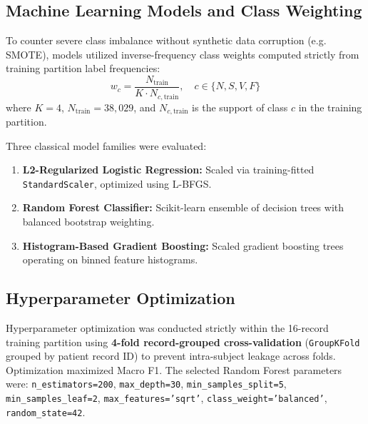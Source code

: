 \documentclass[conference]{IEEEtran}
\begin{document}
\subsection{Machine Learning Models and Class Weighting}
To counter severe class imbalance without synthetic data corruption (e.g. SMOTE), models utilized inverse-frequency class weights computed strictly from training partition label frequencies:
\begin{equation}
    w_c = \frac{N_{\text{train}}}{K \cdot N_{c, \text{train}}}, \quad c \in \{N, S, V, F\}
\end{equation}
where $K=4$, $N_{\text{train}} = 38,029$, and $N_{c, \text{train}}$ is the support of class $c$ in the training partition.

Three classical model families were evaluated:
\begin{enumerate}
    \item \textbf{L2-Regularized Logistic Regression:} Scaled via training-fitted \texttt{StandardScaler}, optimized using L-BFGS.
    \item \textbf{Random Forest Classifier:} Scikit-learn ensemble of decision trees with balanced bootstrap weighting.
    \item \textbf{Histogram-Based Gradient Boosting:} Scaled gradient boosting trees operating on binned feature histograms.
\end{enumerate}

\subsection{Hyperparameter Optimization}
Hyperparameter optimization was conducted strictly within the 16-record training partition using \textbf{4-fold record-grouped cross-validation} (\texttt{GroupKFold} grouped by patient record ID) to prevent intra-subject leakage across folds. Optimization maximized Macro F1. The selected Random Forest parameters were: \texttt{n\_estimators=200}, \texttt{max_depth=30}, \texttt{min_samples_split=5}, \texttt{min_samples_leaf=2}, \texttt{max_features='sqrt'}, \texttt{class_weight='balanced'}, \texttt{random_state=42}.
\end{document}
